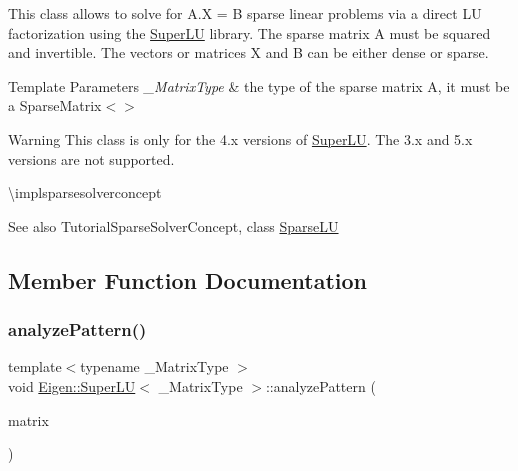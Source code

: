This class allows to solve for A.\+X = B sparse linear problems via a direct LU factorization using the \mbox{\hyperlink{class_eigen_1_1_super_l_u}{Super\+LU}} library. The sparse matrix A must be squared and invertible. The vectors or matrices X and B can be either dense or sparse.


\begin{DoxyTemplParams}{Template Parameters}
{\em \+\_\+\+Matrix\+Type} & the type of the sparse matrix A, it must be a Sparse\+Matrix$<$$>$\\
\hline
\end{DoxyTemplParams}
\begin{DoxyWarning}{Warning}
This class is only for the 4.\+x versions of \mbox{\hyperlink{class_eigen_1_1_super_l_u}{Super\+LU}}. The 3.\+x and 5.\+x versions are not supported.
\end{DoxyWarning}
\textbackslash{}implsparsesolverconcept

\begin{DoxySeeAlso}{See also}
Tutorial\+Sparse\+Solver\+Concept, class \mbox{\hyperlink{class_eigen_1_1_sparse_l_u}{Sparse\+LU}} 
\end{DoxySeeAlso}


\subsection{Member Function Documentation}
\mbox{\label{class_eigen_1_1_super_l_u_a493cdfada27415a6037b004ff974eace}} 
\subsubsection{\texorpdfstring{analyzePattern()}{analyzePattern()}}
{\footnotesize\ttfamily template$<$typename \+\_\+\+Matrix\+Type $>$ \\
void \mbox{\hyperlink{class_eigen_1_1_super_l_u}{Eigen\+::\+Super\+LU}}$<$ \+\_\+\+Matrix\+Type $>$\+::analyze\+Pattern (\begin{DoxyParamCaption}\item[{const Matrix\+Type \&}]{matrix }\end{DoxyParamCaption})\hspace{0.3cm}{\ttfamily [inline]}}

